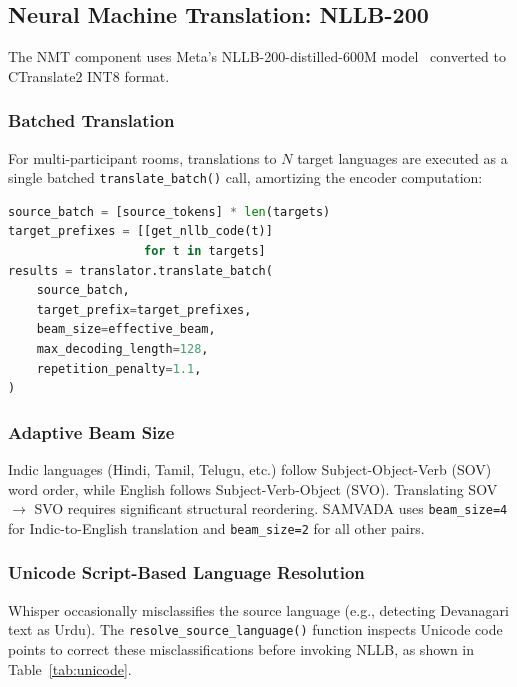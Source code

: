 \documentclass[conference]{IEEEtran}
\begin{document}
\subsection{Neural Machine Translation: NLLB-200}

The NMT component uses Meta's NLLB-200-distilled-600M model~\cite{nllb} converted to CTranslate2 INT8 format.

\subsubsection{Batched Translation}

For multi-participant rooms, translations to $N$ target languages are executed as a single batched \texttt{translate\_batch()} call, amortizing the encoder computation:

\begin{lstlisting}[language=Python, caption={Batched NMT translation}]
source_batch = [source_tokens] * len(targets)
target_prefixes = [[get_nllb_code(t)]
                   for t in targets]
results = translator.translate_batch(
    source_batch,
    target_prefix=target_prefixes,
    beam_size=effective_beam,
    max_decoding_length=128,
    repetition_penalty=1.1,
)
\end{lstlisting}

\subsubsection{Adaptive Beam Size}

Indic languages (Hindi, Tamil, Telugu, etc.) follow Subject-Object-Verb (SOV) word order, while English follows Subject-Verb-Object (SVO). Translating SOV $\rightarrow$ SVO requires significant structural reordering. SAMVADA uses \texttt{beam\_size=4} for Indic-to-English translation and \texttt{beam\_size=2} for all other pairs.

\subsubsection{Unicode Script-Based Language Resolution}

Whisper occasionally misclassifies the source language (e.g., detecting Devanagari text as Urdu). The \texttt{resolve\_source\_language()} function inspects Unicode code points to correct these misclassifications before invoking NLLB, as shown in Table~\ref{tab:unicode}.
\end{document}
